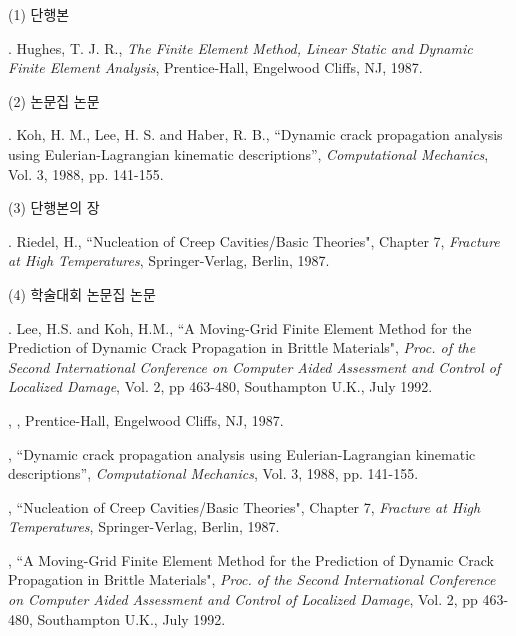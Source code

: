\documentclass[11pt]{ksiamproc_h}
\begin{document}
\noindent (1) 단행본

.  Hughes, T. J. R., {\it The Finite Element Method,
Linear Static and Dynamic Finite Element  Analysis},
Prentice-Hall, Engelwood Cliffs, NJ, 1987.

\bigskip

\noindent (2) 논문집 논문

.  Koh, H. M., Lee, H. S. and Haber, R. B., ``Dynamic
crack propagation analysis using Eulerian-Lagrangian kinematic
descriptions'', {\it Computational Mechanics}, Vol. 3, 1988, pp.
141-155.

\bigskip
\noindent (3) 단행본의 장

.  Riedel, H., ``Nucleation of Creep Cavities/Basic
Theories", Chapter 7, {\it Fracture at High Temperatures},
Springer-Verlag, Berlin, 1987.

\bigskip
\noindent (4) 학술대회 논문집 논문

.  Lee, H.S. and Koh, H.M., ``A Moving-Grid Finite
Element Method for the Prediction of Dynamic Crack Propagation in
Brittle Materials", {\it Proc. of the Second International
Conference on Computer Aided Assessment and Control of Localized
Damage}, Vol. 2, pp 463-480, Southampton U.K., July 1992.



\begin{thebibliography}{11}
,
, Prentice-Hall, Engelwood Cliffs, NJ, 1987.

,
{``Dynamic crack propagation analysis using Eulerian-Lagrangian
kinematic descriptions''}, {\em Computational Mechanics}, Vol. 3,
1988, pp. 141-155.

,
{``Nucleation of Creep Cavities/Basic Theories"},  Chapter 7, {\it
Fracture at High Temperatures}, Springer-Verlag, Berlin, 1987.

,
{``A Moving-Grid Finite Element Method for the Prediction of
Dynamic Crack Propagation in Brittle Materials"}, {\it Proc. of
the Second International Conference on Computer Aided Assessment
and Control of Localized Damage}, Vol. 2, pp 463-480, Southampton
U.K., July 1992.
\end{thebibliography}
\end{document}

